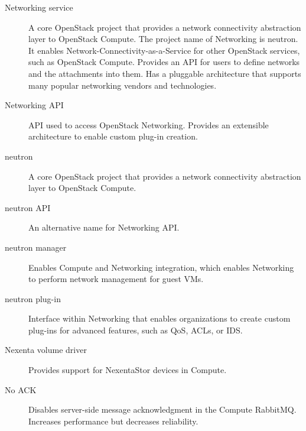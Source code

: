 \documentclass[letterpaper,10pt,english]{sphinxmanual}
\begin{document}
\begin{description}
\item[{Networking service}] \leavevmode{}\label{_source/glossary:term-networking-service}
A core OpenStack project that provides a network connectivity
abstraction layer to OpenStack Compute. The project name of Networking
is neutron. It enables Network-Connectivity-as-a-Service for other
OpenStack services, such as OpenStack Compute. Provides an API for
users to define networks and the attachments into them. Has a
pluggable architecture that supports many popular networking vendors
and technologies.

\item[{Networking API}] \leavevmode{}\label{_source/glossary:term-networking-api}
API used to access OpenStack Networking. Provides an extensible
architecture to enable custom plug-in creation.

\item[{neutron}] \leavevmode{}\label{_source/glossary:term-neutron}
A core OpenStack project that provides a network connectivity
abstraction layer to OpenStack Compute.

\item[{neutron API}] \leavevmode{}\label{_source/glossary:term-neutron-api}
An alternative name for Networking API.

\item[{neutron manager}] \leavevmode{}\label{_source/glossary:term-neutron-manager}
Enables Compute and Networking integration, which enables
Networking to perform network management for guest VMs.

\item[{neutron plug-in}] \leavevmode{}\label{_source/glossary:term-neutron-plug-in}
Interface within Networking that enables organizations to create
custom plug-ins for advanced features, such as QoS, ACLs, or
IDS.

\item[{Nexenta volume driver}] \leavevmode{}\label{_source/glossary:term-nexenta-volume-driver}
Provides support for NexentaStor devices in Compute.

\item[{No ACK}] \leavevmode{}\label{_source/glossary:term-no-ack}
Disables server-side message acknowledgment in the Compute
RabbitMQ. Increases performance but decreases reliability.


\end{description}
\end{document}
